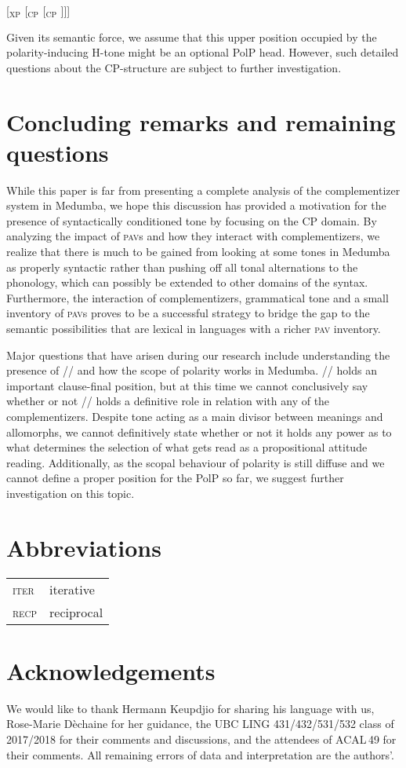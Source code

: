 \documentclass[output=paper,colorlinks,citecolor=brown]{langscibook}
\begin{document}
\ea \label{struc2}
    {[$_{\text{XP}}$  [$_{\text{CP}}$ \text{ {\mbuL} } [$_{\text{CP}}$ ]]]}
\z

Given its semantic force, we assume that this upper position occupied by the polarity-inducing H-tone might be an optional PolP head. However, such detailed questions about the CP-structure are subject to further investigation.

\section{Concluding remarks and remaining questions}

While this paper is far from presenting a complete analysis of the complementizer system in Medumba, we hope this discussion has provided a motivation for the presence of syntactically conditioned tone by focusing on the CP domain. By analyzing the impact of \textsc{pav}s and how they interact with  complementizers, we realize that there is much to be gained from looking at some tones in Medumba as properly syntactic rather than pushing off all tonal alternations to the phonology, which can possibly be extended to other domains of the syntax. Furthermore, the interaction of complementizers, grammatical tone and a small inventory of \textsc{pav}s proves to be a successful strategy to bridge the gap to the semantic possibilities that are lexical in languages with a richer \textsc{pav} inventory.

Major questions that have arisen during our research include understanding the presence of /\la/ and how the scope of polarity works in Medumba. /\la/ holds an important clause-final position, but at this time we cannot conclusively say whether or not /\la/ holds a definitive role in relation with any of the complementizers. Despite tone acting as a main divisor between meanings and allomorphs, we cannot definitively state whether or not it holds any power as to what determines the selection of what gets read as a propositional attitude reading. Additionally, as the scopal behaviour of polarity is still diffuse and we cannot define a proper position for the PolP so far, we suggest further investigation on this topic.

\section*{Abbreviations}
\begin{tabular}[t]{@{}ll@{}}
\textsc{iter} & iterative \\
\textsc{recp} & reciprocal
\end{tabular}

\section*{Acknowledgements}

We would like to thank Hermann Keupdjio for sharing his language with us, Rose-Marie Dèchaine for her guidance, the UBC LING 431/432/531/532 class of 2017\slash 2018 for their comments and discussions, and the attendees of ACAL\,49 for their comments. All remaining errors of data and interpretation are the authors'.

{\printbibliography[heading=subbibliography,notkeyword=this]}
\end{document}
